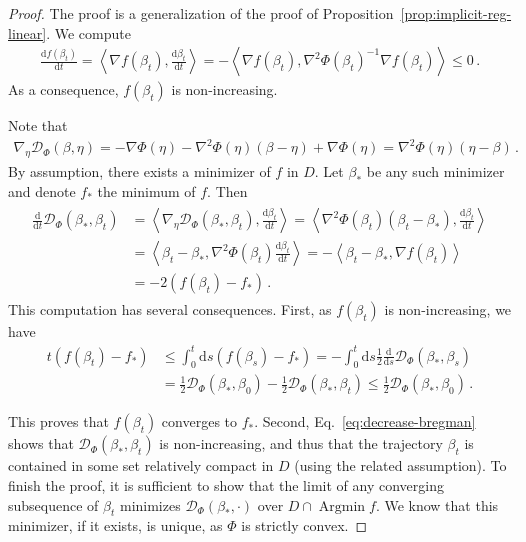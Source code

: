 \documentclass[11pt,reqno]{article}
\DeclareMathOperator*{\Argmin}{Argmin}
\newcommand{\diff}{\mathrm{d}}
\newcommand{\cD}{\mathcal{D}}
\renewcommand{\leq}{\leqslant}
\numberwithin{equation}{section}
\theoremstyle{plain}
\theoremstyle{definition}
\theoremstyle{remark}
\begin{document}
\begin{proof}
	The proof is a generalization of the proof of Proposition~\ref{prop:implicit-reg-linear}. We compute 
	\begin{align*}
		\frac{\diff f(\beta_t)}{\diff t} = \left\langle \nabla f(\beta_t), \frac{\diff \beta_t}{\diff t}\right\rangle = - \left\langle \nabla f(\beta_t), \nabla^2 \Phi(\beta_t)^{-1} \nabla f(\beta_t)\right\rangle  \leq 0 \, .
	\end{align*}
	As a consequence, $f(\beta_t)$ is non-increasing. 

	Note that 
	\begin{align*}
		\nabla_\eta \cD_\Phi(\beta, \eta) = - \nabla \Phi(\eta) - \nabla^2 \Phi(\eta)(\beta - \eta) + \nabla \Phi(\eta) = \nabla^2 \Phi(\eta)(\eta - \beta) \, .
	\end{align*}
	By assumption, there exists a minimizer of $f$ in $D$. Let $\beta_*$ be any such minimizer and denote $f_*$ the minimum of $f$. Then 
	\begin{align}
		\label{eq:decrease-bregman}
		\begin{split}
		\frac{\diff }{\diff t} \cD_\Phi(\beta_*, \beta_t) &= \left\langle \nabla_\eta \cD_\Phi(\beta_*, \beta_t), \frac{\diff \beta_t}{\diff t}\right\rangle =  \left\langle  \nabla^2 \Phi(\beta_t)(\beta_t - \beta_*), \frac{\diff \beta_t}{\diff t}\right\rangle \\
		&= \left\langle \beta_t - \beta_*, \nabla^2 \Phi(\beta_t) \frac{\diff \beta_t}{\diff t}\right\rangle = - \left\langle \beta_t - \beta_*, \nabla f(\beta_t)\right\rangle \\
		&= -2(f(\beta_t) - f_*)\, . 
		\end{split}
	\end{align}
	This computation has several consequences. First, as $f(\beta_t)$ is non-increasing, we have 
	\begin{align*}
		t \left(f(\beta_t) - f_*\right) &\leq \int_{0}^{t} \diff s \left(f(\beta_s) - f_*\right) = - \int_{0}^{t} \diff s \frac{1}{2} \frac{\diff }{\diff s} \cD_\Phi(\beta_*, \beta_s) \\ 
		&= \frac{1}{2}\cD_\Phi(\beta_*, \beta_0) - \frac{1}{2} \cD_\Phi(\beta_*, \beta_t) \leq \frac{1}{2}\cD_\Phi(\beta_*, \beta_0) \, .
	\end{align*}

This proves that $f(\beta_t)$ converges to $f_*$. Second, Eq.~\eqref{eq:decrease-bregman} shows that $\cD_\Phi(\beta_*, \beta_t)$ is non-increasing, and thus that the trajectory $\beta_t$ is contained in some set relatively compact in $D$ (using the related assumption). To finish the proof, it is sufficient to show that the limit of any converging subsequence of $\beta_t$ minimizes $\cD_\Phi(\beta_*, \cdot)$ over $D\cap \Argmin f$. We know that this minimizer, if it exists, is unique, as $\Phi$ is strictly convex. 


\end{proof}
\end{document}
